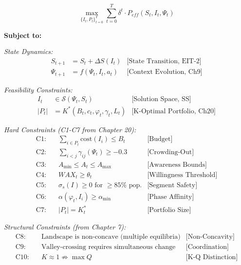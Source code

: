 \begin{tcolorbox}[colback=blue!5!white, colframe=blue!75!black,
    title=\textbf{The EBF Master Problem (UNMAPPED_MP-1)}]

\begin{equation}
\boxed{
\max_{\{I_t, P_t\}_{t=0}^T} \sum_{t=0}^{T} \delta^t \cdot P_{eff}(S_t, I_t, \Psi_t)
}
\label{eq:mp-objective}
\end{equation}

\textbf{Subject to:}

\vspace{0.3em}
\textit{State Dynamics:}
\begin{align}
S_{t+1} &= S_t + \Delta S(I_t) & \text{[State Transition, EIT-2]} \label{eq:mp-state} \\
\Psi_{t+1} &= f(\Psi_t, I_t, a_t) & \text{[Context Evolution, Ch9]} \label{eq:mp-context}
\end{align}

\textit{Feasibility Constraints:}
\begin{align}
I_t &\in \mathcal{S}(\Psi_t, S_t) & \text{[Solution Space, SS]} \label{eq:mp-feasible} \\
|P_t| &= K^*(B_t, c_t, \varphi_t, \gamma_t, L_t) & \text{[K-Optimal Portfolio, Ch20]} \label{eq:mp-kstar}
\end{align}

\textit{Hard Constraints (C1-C7 from Chapter 20):}
\begin{align}
\text{C1:} \quad & \sum_{i \in P_t} \text{cost}(I_i) \leq B_t & \text{[Budget]} \\
\text{C2:} \quad & \sum_{i < j} \gamma_{ij}(\Psi_t) \geq -0.3 & \text{[Crowding-Out]} \\
\text{C3:} \quad & A_{\min} \leq A_t \leq A_{\max} & \text{[Awareness Bounds]} \\
\text{C4:} \quad & WAX_t \geq \theta_t & \text{[Willingness Threshold]} \\
\text{C5:} \quad & \sigma_s(I) \geq 0 \text{ for } \geq 85\% \text{ pop.} & \text{[Segment Safety]} \\
\text{C6:} \quad & \alpha(\varphi_t, I_i) \geq \alpha_{\min} & \text{[Phase Affinity]} \\
\text{C7:} \quad & |P_t| = K^*_t & \text{[Portfolio Size]}
\end{align}

\textit{Structural Constraints (from Chapter 7):}
\begin{align}
\text{C8:} \quad & \text{Landscape is non-concave (multiple equilibria)} & \text{[Non-Concavity]} \\
\text{C9:} \quad & \text{Valley-crossing requires simultaneous change} & \text{[Coordination]} \\
\text{C10:} \quad & K \approx 1 \not\Rightarrow \max Q & \text{[K-Q Distinction]}
\end{align}

\end{tcolorbox}

